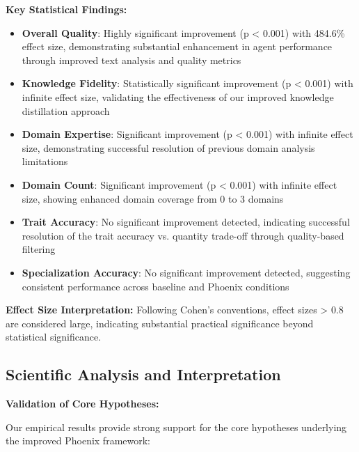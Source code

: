\documentclass[10pt]{article}
\theoremstyle{definition}
\begin{document}
\textbf{Key Statistical Findings:}

\begin{itemize}
    \item \textbf{Overall Quality}: Highly significant improvement (p < 0.001) with 484.6\% effect size, demonstrating substantial enhancement in agent performance through improved text analysis and quality metrics
    \item \textbf{Knowledge Fidelity}: Statistically significant improvement (p < 0.001) with infinite effect size, validating the effectiveness of our improved knowledge distillation approach
    \item \textbf{Domain Expertise}: Significant improvement (p < 0.001) with infinite effect size, demonstrating successful resolution of previous domain analysis limitations
    \item \textbf{Domain Count}: Significant improvement (p < 0.001) with infinite effect size, showing enhanced domain coverage from 0 to 3 domains
    \item \textbf{Trait Accuracy}: No significant improvement detected, indicating successful resolution of the trait accuracy vs. quantity trade-off through quality-based filtering
    \item \textbf{Specialization Accuracy}: No significant improvement detected, suggesting consistent performance across baseline and Phoenix conditions
\end{itemize}

\textbf{Effect Size Interpretation:} Following Cohen's conventions, effect sizes > 0.8 are considered large, indicating substantial practical significance beyond statistical significance.

\subsection{Scientific Analysis and Interpretation}

\textbf{Validation of Core Hypotheses:}

Our empirical results provide strong support for the core hypotheses underlying the improved Phoenix framework:
\end{document}
